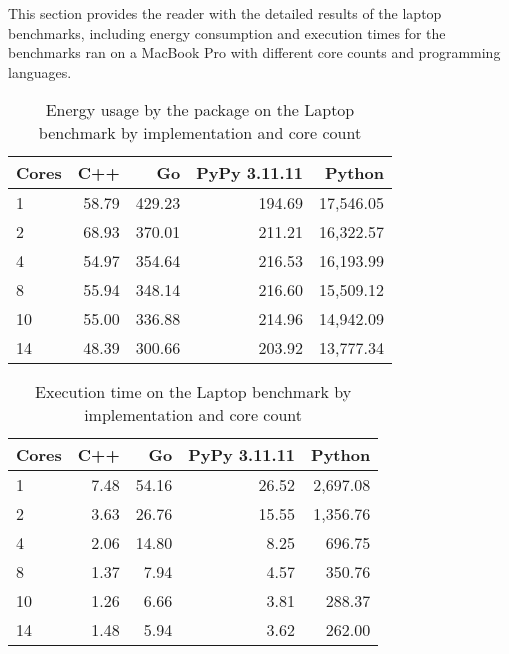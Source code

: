 This section provides the reader with the detailed results of the laptop benchmarks, including energy consumption and execution times for the benchmarks ran on a MacBook Pro with different core counts and programming languages.

\begin{table}[h]
    \centering
    \begin{tabular}{lrrrr}
        \hline
        Cores & C++   & Go       & PyPy 3.11.11 & Python      \\
        \hline
        1     & 58.79  & 429.23  & 194.69       & 17,546.05   \\
        2     & 68.93  & 370.01  & 211.21       & 16,322.57   \\
        4     & 54.97  & 354.64  & 216.53       & 16,193.99   \\
        8     & 55.94  & 348.14  & 216.60       & 15,509.12   \\
        10    & 55.00  & 336.88  & 214.96       & 14,942.09   \\
        14    & 48.39  & 300.66  & 203.92       & 13,777.34   \\
        \hline
    \end{tabular}
\caption[Laptop - Package energy consumption]{Energy usage by the package on the Laptop benchmark by implementation and core count}
\label{tab:mbp-power-consumption}
\end{table}

\begin{table}[h]
    \centering
    \begin{tabular}{lrrrr}
        \hline
        Cores & C++  & Go    & PyPy 3.11.11 & Python    \\
        \hline
        1     & 7.48  & 54.16  & 26.52        & 2,697.08  \\
        2     & 3.63  & 26.76  & 15.55        & 1,356.76  \\
        4     & 2.06  & 14.80  & 8.25         & 696.75    \\
        8     & 1.37  & 7.94   & 4.57         & 350.76    \\
        10    & 1.26  & 6.66   & 3.81         & 288.37    \\
        14    & 1.48  & 5.94   & 3.62         & 262.00    \\
        \hline
    \end{tabular}
\caption[Laptop - Execution Time]{Execution time on the Laptop benchmark by implementation and core count}
\label{tab:mbp-time-execution}
\end{table}



